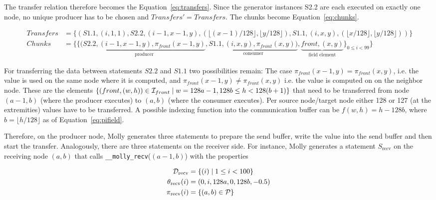 \documentclass{sigplanconf}
\newcommand{\Proc}{{\cal P}}
\newcommand{\Dom}{{\cal D}}
\newcommand{\Idx}{{\cal I}}
\begin{document}
The transfer relation therefore becomes the Equation~\ref{eq:transfers}. Since the generator instances S2.2 are each executed on exactly one node, no unique producer has to be chosen and $Transfers' = Transfers$. The chunks become Equation~\ref{eq:chunks}.

\begin{figure*}
\begin{align}
Transfers &= \big\{ (S1.1, (i,1,1), S2.2, (i-1,x-1,y), (\lfloor (x-1)/128 \rfloor, \lfloor y/128 \rfloor), S1.1, (i,x,y), (\lfloor x/128 \rfloor, \lfloor y/128 \rfloor)) \big\} \label{eq:transfers} \\
  Chunks &= \big\{  \{ ( \underbrace{S2.2, (i-1,x-1,y), \pi_{front}(x-1,y)}_\text{producer}, \underbrace{S1.1, (i,x,y), \pi_{front}(x,y))}_\text{consumer}, \underbrace{front, (x,y)}_\text{field element} \}_{0 \le i < 99} \big\} \label{eq:chunks}
\end{align}
\end{figure*}




For transferring the data between statements $S2.2$ and $S1.1$ two possibilities remain: The case $\pi_{front}(x-1,y) = \pi_{front}(x,y)$, i.e. the value is used on the same node where it is computed, and $\pi_{front}(x-1,y) \neq \pi_{front}(x,y)$ i.e. the value is computed on on the neighbor node. These are the elements $ \{ (front, (w,h)) \in \Idx_{front} \mid  w = 128a - 1 , 128b \le h < 128(b+1) \}$ that need to be transferred from node $(a-1,b)$ (where the producer executes) to $(a,b)$ (where the consumer executes). Per source node/target node either 128 or 127 (at the extremities) values have to be transferred. A possible indexing function into the communication buffer can be $f(w,h) = h - 128b$, where $b = \lfloor h/128 \rfloor$ as of Equation~\ref{eq:pifield}.

Therefore, on the producer node, Molly generates three statements to prepare the send buffer, write the value into the send buffer and then start the transfer. Analogously, there are three statements on the receiver side. For instance, Molly generates a statement $S_\text{recv}$ on the receiving node $(a,b)$ that calls \texttt{\_\_molly\_recv}($(a-1,b)$) with the properties

\begin{align*}
  \Dom_\text{recv} &= \{ (i) \mid 1 \le i < 100  \}\\
  \theta_\text{recv}(i) &= (0,i,128a,0,128b,-0.5)\\
  \pi_\text{recv}(i) &= \{ (a,b) \in \Proc \}
\end{align*}
\end{document}
